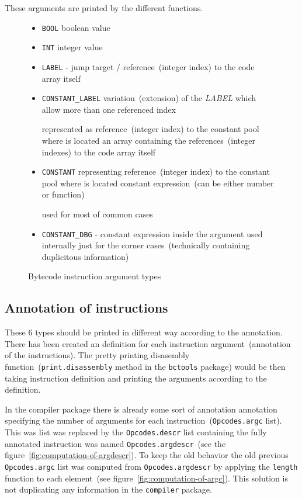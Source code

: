 \documentclass[thesis=M,english]{FITthesis}[2018/10/20]
\newcommand{\code}[1]{\texttt{#1}}
\begin{document}
These arguments are printed by the different functions.

\begin{figure}[!h]
\begin{itemize}
	\item \code{BOOL} boolean value

	\item \code{INT} integer value

	\item \code{LABEL} - jump target / reference~(integer index) to the code array itself

	\item \code{CONSTANT{\_}LABEL} variation~(extension) of the \textit{LABEL} which allow more than one referenced index
	
	represented as reference~(integer index) to the constant pool where is located an array containing the references~(integer indexes) to the code array itself

	\item \code{CONSTANT} representing reference~(integer index) to the constant pool where is located constant expression~(can be either number or function)

	used for most of common cases

	\item \code{CONSTANT{\_}DBG} - constant expression inside the argument used internally just for the corner cases~(technically containing duplicitous information)
\end{itemize}
	\caption{Bytecode instruction argument types}\label{fig:bytecode-argument-types}
\end{figure}


\subsection{Annotation of instructions}\label{annotation-of-instructions}
These 6 types should be printed in different way according to the annotation. There has been created an definition for each instruction argument~(annotation of the instructions). The pretty printing disasembly function~(\code{print.disassembly} method in the \code{bctools} package) would be then taking instruction definition and printing the arguments according to the definition. 

In the compiler package there is already some sort of annotation annotation specifying the number of arguments for each instruction~(\code{Opcodes.argc} list). This was list was replaced by the \code{Opcodes.descr} list containing the fully annotated instruction was named \code{Opcodes.argdescr}~(see the figure~\ref{fig:computation-of-argdescr}). To keep the old behavior the old previous \code{Opcodes.argc} list was computed from \code{Opcodes.argdescr} by applying the \code{length} function to each element~(see figure~\ref{fig:computation-of-argc}). This solution is not duplicating any information in the \code{compiler} package.
\end{document}
